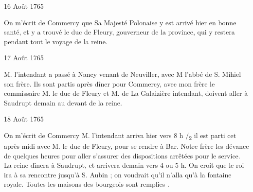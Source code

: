                      \begin{diary}{16 Août 1765}{}

                         On m'écrit de Commercy que Sa Majesté Polonaise
                           y est arrivé hier en bonne santé, et
                           y a trouvé le duc de Fleury,
                           gouverneur
                           de la province, qui y restera pendant tout le voyage de la reine. \bigskip


                     \end{diary}

                     \begin{diary}{17 Août 1765}{}


                           M. l'intendant a passé à
                              Nancy venant
                           de Neuviller, avec M l'abbé de S. Mihiel
                           son frère. Ils sont partis après dîner
                           pour Commercy, avec mon frère le commissaire
                           M. le duc de Fleury et M. de La Galaizière
                              intendant, doivent aller à Saudrupt demain
                           au devant de la
                           reine. \bigskip


                     \end{diary}

                     \begin{diary}{18 Août 1765}{}

                         On m'écrit de Commercy
                           \og M. l'intendant
                              arriva hier vers 8 h /\textsubscript{2} il est parti cet après
                              midi avec M. le duc de Fleury,
                              pour se rendre
                              à Bar. Notre frère les dévance de quelques
                              heures pour aller s'assurer des dispositions
                              arrêtées pour le service. La reine dînera
                              à Saudrupt, et arrivera
                                 demain vers 4 ou 5 h.
                              On croit que le roi ira
                              à sa rencontre jusqu'à
                              S. Aubin ; on voudrait
                              qu'il n'alla qu'à la
                                 fontaine royale. Toutes les maisons des
                              bourgeois sont remplies \fg{}. \bigskip


                     \end{diary}

